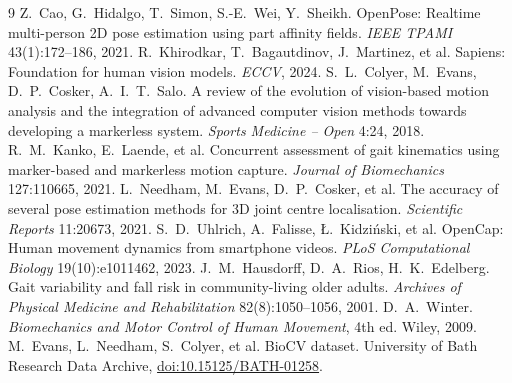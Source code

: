 \documentclass[11pt]{article}
\begin{document}
\begin{thebibliography}{9}\small
{} Z.~Cao, G.~Hidalgo, T.~Simon, S.-E.~Wei, Y.~Sheikh. OpenPose: Realtime multi-person 2D pose estimation using part affinity fields. \emph{IEEE TPAMI} 43(1):172--186, 2021.
 R.~Khirodkar, T.~Bagautdinov, J.~Martinez, et al. Sapiens: Foundation for human vision models. \emph{ECCV}, 2024.
 S.~L.~Colyer, M.~Evans, D.~P.~Cosker, A.~I.~T.~Salo. A review of the evolution of vision-based motion analysis and the integration of advanced computer vision methods towards developing a markerless system. \emph{Sports Medicine -- Open} 4:24, 2018.
 R.~M.~Kanko, E.~Laende, et al. Concurrent assessment of gait kinematics using marker-based and markerless motion capture. \emph{Journal of Biomechanics} 127:110665, 2021.
 L.~Needham, M.~Evans, D.~P.~Cosker, et al. The accuracy of several pose estimation methods for 3D joint centre localisation. \emph{Scientific Reports} 11:20673, 2021.
 S.~D.~Uhlrich, A.~Falisse, \L.~Kidzi\'nski, et al. OpenCap: Human movement dynamics from smartphone videos. \emph{PLoS Computational Biology} 19(10):e1011462, 2023.
 J.~M.~Hausdorff, D.~A.~Rios, H.~K.~Edelberg. Gait variability and fall risk in community-living older adults. \emph{Archives of Physical Medicine and Rehabilitation} 82(8):1050--1056, 2001.
 D.~A.~Winter. \emph{Biomechanics and Motor Control of Human Movement}, 4th ed. Wiley, 2009.
 M.~Evans, L.~Needham, S.~Colyer, et al. BioCV dataset. University of Bath Research Data Archive, \href{https://doi.org/10.15125/BATH-01258}{doi:10.15125/BATH-01258}.
\end{thebibliography}
\end{document}
